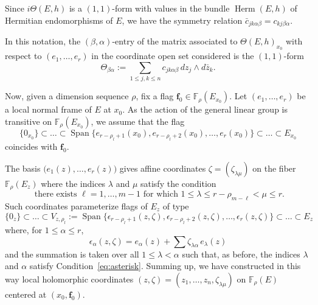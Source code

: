 \documentclass[a4paper]{amsart}
\theoremstyle{plain}%
\theoremstyle{definition}
\theoremstyle{remark}
\newcommand{\FF}{\mathbb{F}}
\begin{document}
Since $ i \Theta(E,h) $ is a $ (1,1) $-form with values in the bundle $ \operatorname{Herm}(E,h) $ of Hermitian endomorphisms of $ E $, we have the symmetry relation $ \bar{c}_{jk\alpha\beta} = c_{kj\beta\alpha} $.

In this notation, the $ (\beta,\alpha) $-entry of the matrix associated to $ \Theta(E,h)_{x_0} $ with respect to $ (e_1,\dots,e_r) $ in the coordinate open set considered is the $ (1,1) $-form
\begin{equation*}
	\Theta_{\beta\alpha} := \sum_{1 \le j,k \le n} c_{jk\alpha\beta} \, dz_j \wedge d\bar{z}_k.
\end{equation*}

Now, given a dimension sequence $ \rho $, fix a flag $ \mathbf{f}_0 \in \FF_{\rho}(E_{x_0}) $.
Let $ (e_1,\dots,e_r) $ be a local normal frame of $ E $ at $ x_0 $.
As the action of the general linear group is transitive on $ \FF_{\rho}(E_{x_0}) $, we assume that the flag
\begin{equation*}
	\{ 0_{x_0} \} \subset \dots \subset \operatorname{Span}\bigl\{ e_{r-\rho_l+1}(x_0),e_{r-\rho_l+2}(x_0),\dots,e_{r}(x_0) \bigr\} \subset \dots \subset E_{x_0}
\end{equation*}
coincides with $ \mathbf{f}_0 $.

The basis $ \bigl( e_1(z), \dots, e_r(z) \bigr)$ gives affine coordinates $ \zeta = (\zeta_{\lambda\mu}) $ on the fiber $ \FF_{\rho}(E_z) $ where the indices $ \lambda $ and $ \mu $ satisfy the condition
\begin{equation*}\label{eq:asterisk}
	\text{ there exists } \ell = 1, \dots, m-1 \text{ for which } 1 \le \lambda \le r - \rho_{m-\ell} < \mu \le r . \tag{$*$}
\end{equation*}
Such coordinates parameterize flags of $ E_{z} $ of type
\[
\{ 0_{z} \} \subset \dots \subset V_{z,\rho_{l}} := \operatorname{Span} \bigl\{\epsilon_{r-\rho_l+1}(z,\zeta),\epsilon_{r-\rho_l+2}(z,\zeta),\dots,\epsilon_{r}(z,\zeta) \bigr\} \subset \dots \subset E_{z}
\]
where, for $ 1 \le \alpha \le r $,
\begin{equation*}
	\epsilon_{\alpha}(z,\zeta)=e_{\alpha}(z) + \sum \zeta_{\lambda \alpha}\, e_\lambda(z)
\end{equation*}
and the summation is taken over all $ 1 \le \lambda < \alpha $ such that, as before, the indices $ \lambda $ and $ \alpha $ satisfy Condition~\eqref{eq:asterisk}.
Summing up, we have constructed in this way local holomorphic coordinates $ (z,\zeta) = \left( z_1,\dots,z_n, \zeta_{\lambda\mu} \right) $ on $ \FF_{\rho}(E) $ centered at $ (x_0,\mathbf{f}_0) $.
\end{document}
